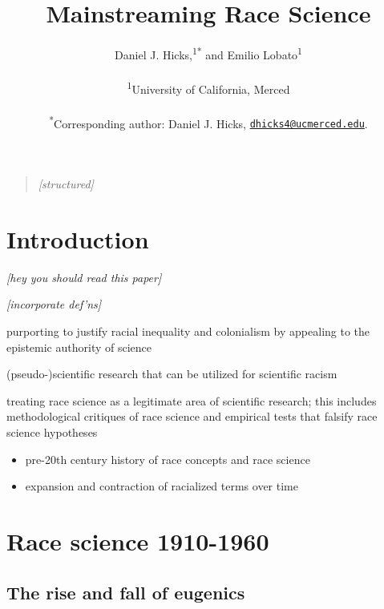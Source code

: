 \documentclass[12pt]{article}
\title{\bf Mainstreaming Race Science}
\author{
Daniel J. Hicks,\textsuperscript{1}\textsuperscript{*}
and Emilio Lobato\textsuperscript{1}
\\
\\
\normalsize{\textsuperscript{1}University of California, Merced}\\
\\
\textsuperscript{*}Corresponding author: Daniel J. Hicks, \href{mailto:dhicks4@ucmerced.edu}{\nolinkurl{dhicks4@ucmerced.edu}}.
}
\date{}
\providecommand{\tightlist}{%
  \setlength{\itemsep}{0pt}\setlength{\parskip}{0pt}}
\newenvironment{sciabstract}{%
\begin{quote} \singlespacing}
{\end{quote}}
\begin{document}

\baselineskip24pt


\maketitle


\begin{sciabstract}
\emph{{[}structured{]}}
\end{sciabstract}

\hypertarget{introduction}{%
\section*{Introduction}\label{introduction}}

\emph{{[}hey you should read this paper{]}}

\emph{{[}incorporate def'ns{]}}

\begin{description}
\tightlist
\item[scientific racism]
purporting to justify racial inequality and colonialism by appealing to the epistemic authority of science
\item[race science]
(pseudo-)scientific research that can be utilized for scientific racism
\item[race science discourse]
treating race science as a legitimate area of scientific research; this includes methodological critiques of race science and empirical tests that falsify race science hypotheses
\end{description}

\begin{itemize}
\tightlist
\item
  pre-20th century history of race concepts and race science
\item
  expansion and contraction of racialized terms over time
\end{itemize}

\hypertarget{race-science-1910-1960}{%
\section*{Race science 1910-1960}\label{race-science-1910-1960}}

\hypertarget{the-rise-and-fall-of-eugenics}{%
\subsection*{The rise and fall of eugenics}\label{the-rise-and-fall-of-eugenics}}
\end{document}
